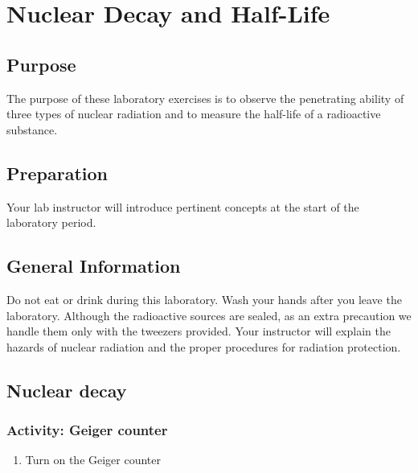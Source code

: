 \chapter {Nuclear Decay and Half-Life}

\begin{multicols}{2}
\section {Purpose} The purpose of these laboratory exercises is to observe the penetrating ability of three types of nuclear radiation and to measure the half-life of a radioactive substance.

\section {Preparation} Your lab instructor will introduce pertinent concepts at the start of the laboratory period.

\section {General Information}
Do not eat or drink during this laboratory. Wash your hands after you leave the laboratory. Although the radioactive sources are sealed, as an extra precaution we handle them only with the tweezers provided. Your instructor will explain the hazards of nuclear radiation and the proper procedures for radiation protection.

\section {Nuclear decay}

\subsection{Activity: Geiger counter}
\begin{enumerate}
	 \item Turn on the Geiger counter


\end{enumerate}
\end{multicols}
